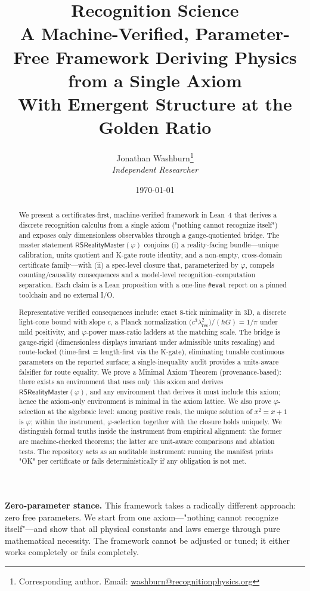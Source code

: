 \documentclass[11pt,a4paper,twoside]{article}
\title{%
    \vspace{-2em}%
    {\huge\bfseries Recognition Science}\\[1em]
    {\Large A Machine-Verified, Parameter-Free Framework Deriving Physics from a Single Axiom}\\[0.8em]
    {\large With Emergent Structure at the Golden Ratio}\\[1.5em]
}
\author{
    Jonathan Washburn\thanks{Corresponding author. Email: \href{mailto:washburn@recognitionphysics.org}{washburn@recognitionphysics.org}}\\
    \textit{Independent Researcher}
}
\date{\today}
\numberwithin{equation}{section}
\theoremstyle{customthm}
\theoremstyle{customdef}
\theoremstyle{customrem}
\begin{document}
\maketitle

\begin{abstract}
\noindent We present a certificates-first, machine-verified framework in Lean~4 that derives a discrete recognition calculus from a single axiom ("nothing cannot recognize itself") and exposes only dimensionless observables through a gauge-quotiented bridge. The master statement $\mathsf{RSRealityMaster}(\varphi)$ conjoins (i) a reality-facing bundle—unique calibration, units quotient and K-gate route identity, and a non-empty, cross-domain certificate family—with (ii) a spec-level closure that, parameterized by $\varphi$, compels counting/causality consequences and a model-level recognition–computation separation. Each claim is a Lean proposition with a one-line \texttt{\#eval} report on a pinned toolchain and no external I/O.

Representative verified consequences include: exact 8-tick minimality in 3D, a discrete light-cone bound with slope $c$, a Planck normalization $\big(c^3\lambda_{\mathrm{rec}}^2\big)/(\hbar G)=1/\pi$ under mild positivity, and $\varphi$-power mass-ratio ladders at the matching scale. The bridge is gauge-rigid (dimensionless displays invariant under admissible units rescaling) and route-locked (time-first = length-first via the K-gate), eliminating tunable continuous parameters on the reported surface; a single-inequality audit provides a units-aware falsifier for route equality. We prove a Minimal Axiom Theorem (provenance-based): there exists an environment that uses only this axiom and derives $\mathsf{RSRealityMaster}(\varphi)$, and any environment that derives it must include this axiom; hence the axiom-only environment is minimal in the axiom lattice. We also prove $\varphi$-selection at the algebraic level: among positive reals, the unique solution of $x^2 = x + 1$ is $\varphi$; within the instrument, $\varphi$-selection together with the closure holds uniquely. We distinguish formal truths inside the instrument from empirical alignment: the former are machine-checked theorems; the latter are unit-aware comparisons and ablation tests. The repository acts as an auditable instrument: running the manifest prints "OK" per certificate or fails deterministically if any obligation is not met.
\end{abstract}

\noindent\textbf{Zero-parameter stance.} This framework takes a radically different approach: zero free parameters. We start from one axiom—"nothing cannot recognize itself"—and show that all physical constants and laws emerge through pure mathematical necessity. The framework cannot be adjusted or tuned; it either works completely or fails completely.
\end{document}
